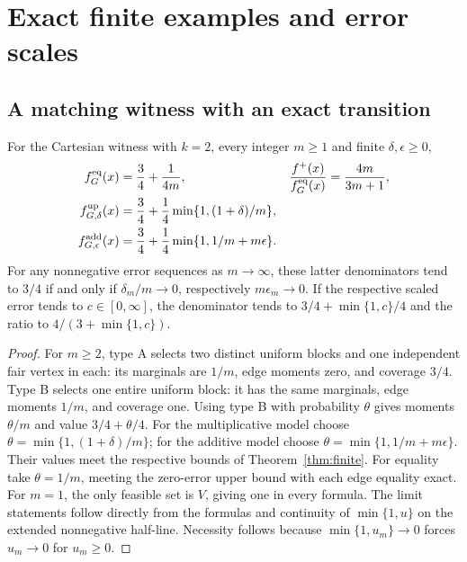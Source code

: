 \section{Exact finite examples and error scales}\label{sec:finite}
\subsection{A matching witness with an exact transition}\label{sec:matching}

\begin{theorem}\label{thm:matching}
For the Cartesian witness with \(k=2\), every integer \(m\geq1\) and
finite \(\delta,\epsilon\geq0\),
\begin{align}
 f_G^{\mathrm{eq}}(x)&=\frac34+\frac1{4m},&
 \frac{f^+(x)}{f_G^{\mathrm{eq}}(x)}&=\frac{4m}{3m+1},\label{eq:matching-eq}\\
 f_{G,\delta}^{\mathrm{up}}(x)&=\frac34+\frac14\min\{1,(1+\delta)/m\},\label{eq:matching-mult}\\
 f_{G,\epsilon}^{\mathrm{add}}(x)&=\frac34+\frac14\min\{1,1/m+m\epsilon\}.\label{eq:matching-add}
\end{align}
For any nonnegative error sequences as \(m\to\infty\), these latter
denominators tend to \(3/4\) if and only if \(\delta_m/m\to0\),
respectively \(m\epsilon_m\to0\). If the respective scaled error tends
to \(c\in[0,\infty]\), the denominator tends to
\(3/4+\min\{1,c\}/4\) and the ratio to \(4/(3+\min\{1,c\})\).
\end{theorem}
\begin{proof}
For \(m\geq2\), type A selects two distinct uniform blocks and one
independent fair vertex in each: its marginals are \(1/m\), edge moments
zero, and coverage \(3/4\). Type B selects one entire uniform block:
it has the same marginals, edge moments \(1/m\), and coverage one.
Using type B with probability \(\theta\) gives moments \(\theta/m\)
and value \(3/4+\theta/4\). For the multiplicative model choose
\(\theta=\min\{1,(1+\delta)/m\}\); for the additive model choose
\(\theta=\min\{1,1/m+m\epsilon\}\). Their values meet the respective
bounds of Theorem~\ref{thm:finite}. For equality take \(\theta=1/m\),
meeting the zero-error upper bound with each edge equality exact.
For \(m=1\), the only feasible set is \(V\), giving one in every formula.
The limit statements follow directly from the formulas and continuity of
\(\min\{1,u\}\) on the extended nonnegative half-line. Necessity follows
because \(\min\{1,u_m\}\to0\) forces \(u_m\to0\) for \(u_m\geq0\).
\end{proof}

